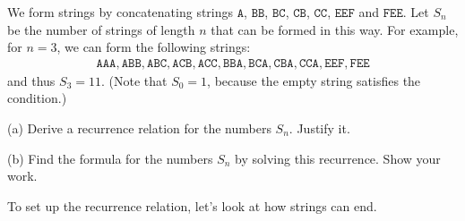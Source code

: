 
\newcommand{\ttA}{\texttt{A}}
\newcommand{\ttB}{\texttt{B}}
\newcommand{\ttC}{\texttt{C}}
\newcommand{\ttE}{\texttt{E}}
\newcommand{\ttF}{\texttt{F}}

\begin{problem}
We form strings by concatenating strings $\ttA$, $\ttB\ttB$, $\ttB\ttC$, $\ttC\ttB$, $\ttC\ttC$,
$\ttE\ttE\ttF$ and $\ttF\ttE\ttE$. Let $S_n$ be the number of strings of length $n$ that can
be formed in this way. For example, for $n=3$, we can form the following strings:
%
\begin{align*}
\ttA\ttA\ttA
,
\ttA\ttB\ttB  , \ttA\ttB\ttC  , \ttA\ttC\ttB  , \ttA\ttC\ttC
,
\ttB\ttB\ttA  , \ttB\ttC\ttA  , \ttC\ttB\ttA  , \ttC\ttC\ttA 
,
\ttE\ttE\ttF , \ttF\ttE\ttE
\end{align*}
%
and thus $S_3 = 11$. (Note that $S_0 = 1$, because the
empty string satisfies the condition.)

\smallskip
\noindent (a) Derive a recurrence relation for
        the numbers $S_n$. Justify it.

\smallskip
\noindent (b) Find the formula for the numbers $S_n$
                by solving this recurrence.
                Show your work.
\end{problem}

\begin{solution}

To set up the recurrence relation, let's look at how strings can end.


\end{solution}
